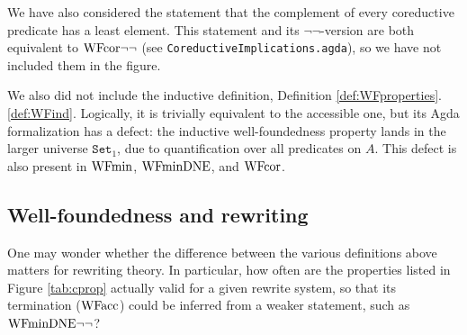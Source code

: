 \begin{enumerate}

\end{enumerate}

We have also considered the statement that the complement of every coreductive predicate
  has a least element.  This statement and its $\lnot\lnot$-version are both equivalent to $\mathrm{WFcor}{\lnot\lnot}$
  (see \texttt{CoreductiveImplications.agda}), so we have not included them in the figure.

We also did not include the inductive definition, Definition \ref{def:WFproperties}.\ref{def:WFind}.
  Logically, it is trivially equivalent to the accessible one, but its Agda formalization has a defect:
  the inductive well-foundedness property lands in the larger universe $\mathtt{Set}_1$, due to
  quantification over all predicates on $A$.  This defect is also present in $\mathrm{WFmin}$, $\mathrm{WFminDNE}$,
  and $\mathrm{WFcor}$.


\subsection{Well-foundedness and rewriting}

One may wonder whether the difference between the various definitions above matters for 
rewriting theory.  In particular, how often are the properties listed in 
Figure \ref{tab:cprop} actually valid for a given rewrite system, so that its termination 
($\mathrm{WFacc}$) could be inferred from a weaker statement, such as $\mathrm{WFminDNE}{\lnot\lnot}$?

